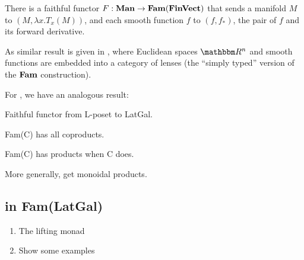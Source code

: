 \begin{proposition}
  There is a faithful functor $F : \mathbf{Man} \to \mathbf{Fam}(\mathbf{FinVect})$ that sends
  a manifold $M$ to $(M, \lambda x. T_x(M))$, and each smooth function
  $f$ to $(f, f_*)$, the pair of $f$ and its forward derivative.
\end{proposition}

As similar result is given in \cite{cruttwell2022}, where Euclidean
spaces $\RR^n$ and smooth functions are embedded into a category of
lenses (the ``simply typed'' version of the $\mathbf{Fam}$ construction).

For \GPS, we have an analogous result:

\begin{lemma}
  Faithful functor from L-poset to LatGal.
\end{lemma}



\begin{lemma}
  Fam(C) has all coproducts.
\end{lemma}

\begin{lemma}
  Fam(C) has products when C does.
\end{lemma}

More generally, get monoidal products.

\subsection{\GPS in Fam(LatGal)}

\begin{enumerate}
\item The lifting monad
\item Show some examples
\end{enumerate}
